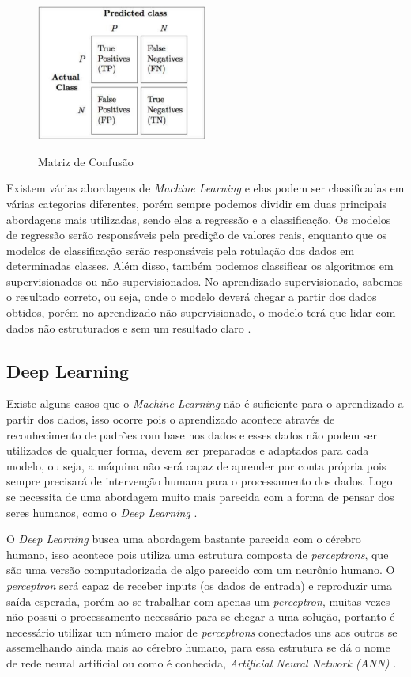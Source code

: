 \begin{figure}[!htb]
	\centering
	\caption{Matriz de Confusão}
	\includegraphics[width=0.50\textwidth]{img/confusionMatrix.jpg}
	\label{fig:confusionMatrix}
\end{figure}

Existem várias abordagens de \emph{Machine Learning} e elas podem ser classificadas em várias categorias diferentes, porém sempre podemos dividir em duas principais abordagens mais utilizadas, sendo elas a regressão e a classificação. Os modelos de regressão serão responsáveis pela predição de valores reais, enquanto que os modelos de classificação serão responsáveis pela rotulação dos dados em determinadas classes. Além disso, também podemos classificar os algoritmos em supervisionados ou não supervisionados. No aprendizado supervisionado, sabemos o resultado correto, ou seja, onde o modelo deverá chegar a partir dos dados obtidos, porém no aprendizado não supervisionado, o modelo terá que lidar com dados não estruturados e sem um resultado claro \cite{machineLearningPython}.

\subsection{Deep Learning}
Existe alguns casos que o \emph{Machine Learning} não é suficiente para o aprendizado a partir dos dados, isso ocorre pois o aprendizado acontece através de reconhecimento de padrões com base nos dados e esses dados não podem ser utilizados de qualquer forma, devem ser preparados e adaptados para cada modelo, ou seja, a máquina não será capaz de aprender por conta própria pois sempre precisará de intervenção humana para o processamento dos dados. Logo se necessita de uma abordagem muito mais parecida com a forma de pensar dos seres humanos, como o \emph{Deep Learning} \cite{deepLearningPython, deepLearningTensorFlow}.

O \emph{Deep Learning} busca uma abordagem bastante parecida com o cérebro humano, isso acontece pois utiliza uma estrutura composta de \emph{perceptrons}, que são uma versão computadorizada de algo parecido com um neurônio humano. O \emph{perceptron} será capaz de receber inputs (os dados de entrada) e reproduzir uma saída esperada, porém ao se trabalhar com apenas um \emph{perceptron}, muitas vezes não possui o processamento necessário para se chegar a uma solução, portanto é necessário utilizar um número maior de \emph{perceptrons} conectados uns aos outros se assemelhando ainda mais ao cérebro humano, para essa estrutura se dá o nome de rede neural artificial ou como é conhecida, \emph{Artificial Neural Network (ANN)} \cite{deepLearning, deepLearningTensorFlow}.

